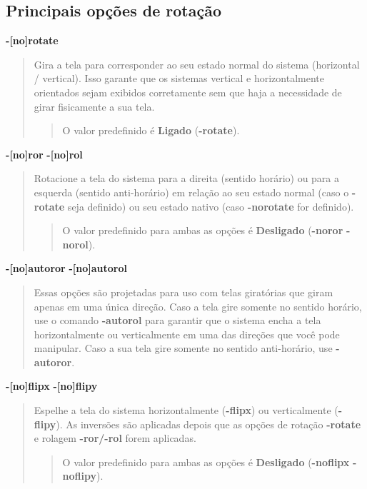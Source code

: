 \documentclass[letterpaper,10pt,brazil]{sphinxmanual}
\begin{document}
\subsection{Principais opções de rotação}
\label{commandline/commandline-all:principais-opcoes-de-rotacao}\label{commandline/commandline-all:mame-commandline-norotate}
\textbf{-{[}no{]}rotate}
\begin{quote}

Gira a tela para corresponder ao seu estado normal do sistema
(horizontal / vertical). Isso garante que os sistemas vertical e
horizontalmente orientados sejam exibidos corretamente sem que haja
a necessidade de girar fisicamente a sua tela.
\begin{quote}

O valor predefinido é \textbf{Ligado} (\textbf{-rotate}).
\end{quote}
\end{quote}
\label{commandline/commandline-all:mame-commandline-noror}\label{commandline/commandline-all:mame-commandline-norol}
\textbf{-{[}no{]}ror}
\textbf{-{[}no{]}rol}
\begin{quote}

Rotacione a tela do sistema para a direita (sentido horário) ou para
a esquerda (sentido anti-horário) em relação ao seu estado normal
(caso o \textbf{-rotate} seja definido) ou seu estado nativo
(caso \textbf{-norotate} for definido).
\begin{quote}

O valor predefinido para ambas as opções é \textbf{Desligado}
(\textbf{-noror} \textbf{-norol}).
\end{quote}
\end{quote}
\label{commandline/commandline-all:mame-commandline-noautoror}\label{commandline/commandline-all:mame-commandline-noautorol}
\textbf{-{[}no{]}autoror}
\textbf{-{[}no{]}autorol}
\begin{quote}

Essas opções são projetadas para uso com telas giratórias que giram
apenas em uma única direção. Caso a tela gire somente no sentido
horário, use o comando \textbf{-autorol} para garantir que o sistema
encha a tela horizontalmente ou verticalmente em uma das direções
que você pode manipular. Caso a sua tela gire somente no sentido
anti-horário, use \textbf{-autoror}.
\end{quote}
\label{commandline/commandline-all:mame-commandline-noflipx}\label{commandline/commandline-all:mame-commandline-noflipy}
\textbf{-{[}no{]}flipx}
\textbf{-{[}no{]}flipy}
\begin{quote}

Espelhe a tela do sistema horizontalmente (\textbf{-flipx}) ou
verticalmente (\textbf{-flipy}). As inversões são aplicadas depois que as
opções de rotação \textbf{-rotate} e rolagem \textbf{-ror/-rol} forem
aplicadas.
\begin{quote}

O valor predefinido para ambas as opções é \textbf{Desligado}
(\textbf{-noflipx} \textbf{-noflipy}).
\end{quote}
\end{quote}
\end{document}

